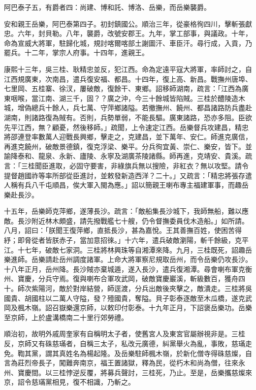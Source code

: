 \begin{pinyinscope}
阿巴泰子五，有爵者四：尚建、博和託、博洛、岳樂，而岳樂襲爵。

安和親王岳樂，阿巴泰第四子。初封鎮國公。順治三年，從豪格徇四川，擊斬張獻忠。六年，封貝勒。八年，襲爵，改號安郡王。九年，掌工部事，與議政。十年，命為宣威大將軍，駐歸化城，規討喀爾喀部土謝圖汗、車臣汗。尋行成，入貢，乃罷兵。十二年，掌宗人府事。十四年，進親王。

康熙十三年，吳三桂、耿精忠並反，犯江西。命為定遠平寇大將軍，率師討之，自江西規廣東，次南昌，遣兵復安福、都昌。十四年，復上高、新昌。戰撫州唐埠、七里岡、五桂寨、徐汊，屢破敵，復餘干、東鄉。詔移師湖南，疏言：「江西為廣東咽喉，當江南、湖三千，固？？廣之沖，今三十餘城皆陷賊。三桂於醴陵造木城，增偽總兵十餘人，兵七萬、守萍鄉諸隘。若撤撫州、饒州、都昌諸路防兵盡赴湖南，則諸路復為賊有。否則，兵勢單弱，不能長驅。廣東諸路，恐亦多阻。臣欲先平江西，無？顧憂，然後移師。」疏聞，上令速定江西。岳樂督兵攻建昌，精忠將邵連登率數萬人迎戰長興鄉，擊走之，克建昌，並下萬年、安仁。師進克廣信，再進克饒州，破敵景德鎮，復克浮梁、樂平。分兵徇宜黃、崇仁、樂安，皆下。並諭降泰和、龍泉、永新、廬陵、永寧及湖廣茶陵諸縣。師再進，克靖安、貴溪。疏言：「三桂聞臣進取，必固守要害，非綠旗兵無以搜險，非紅衣？無以攻堅。請令提督趙國祚等率所部從臣進討，並敕發新造西洋？二十。」又疏言：「精忠將張存遣人稱有兵八千屯順昌，俟大軍入閩為應。」詔以簡親王喇布專主福建軍事，而趣岳樂赴長沙。

十五年，岳樂師克萍鄉，遂薄長沙。疏言：「敵船集長沙城下，我師無船，難以應敵。長沙附近林木頗盛，請先撥戰艦七十艘，仍令督撫委員伐木造船。」如所請。八月，詔曰：「朕聞王復萍鄉，直抵長沙，甚為嘉悅。王其善撫百姓，使困苦得紓；即脅從者皆朕赤子，當加意招徠。」十六年，遣兵破敵瀏陽，斬千餘級，克平江。十七年，破敵七家洞。三桂將林興珠等自湘潭來降。九月，三桂既死，詔趣岳樂進師。岳樂請赴岳州調度諸軍。上命大將軍察尼規取岳州，而令岳樂仍攻長沙。十八年正月，岳州降。長沙賊亦棄城遁，遂入長沙，遣兵復湘潭。尋會喇布軍克衡州、寶慶，分兵守焉。復與喇布合軍攻武岡，破敵寶慶巖溪，斬級數百，獲舟四十。師次紫陽河，敵於對岸結營，師逕渡，分兵出敵後夾擊之，敵潰走。三桂將吳國貴、胡國柱以二萬人守隘，發？殪國貴，奪隘。貝子彰泰逐敵至木瓜橋，遂克武岡及楓木嶺。詔召嶽樂還京師，以敕印付彰泰。十九年正月，下詔褒岳樂功。岳樂至京師，上於盧溝橋南二十里行郊勞禮。

順治初，故明外戚周奎家有自稱明太子者，使舊宮人及東宮官屬辦視非是。三桂反，京師又有硃慈璊者，自稱三太子，私改元廣德，糾黨舉火為亂，事敗，慈璊走免。鞫其黨，謂其真姓名為楊起隆。及岳樂駐師楓木嶺，於新化僧寺得硃慈燦，自言為莊烈帝長子，闖難奔南京，福王置諸獄，釋為民，從朽木和尚為僧，往來永州、寶慶間。以三桂悖逆反覆，將募兵聲討，三桂死，乃止。至是，岳樂攜慈燦來京，詔令慈璊黨相見，復不相識，乃斬之。


\end{pinyinscope}
